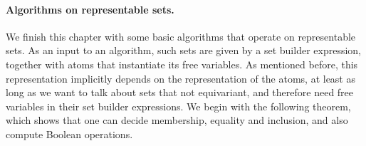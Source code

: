 \paragraph*{Algorithms on representable sets.}
\label{sec:algorithms-set-builder}
We finish this chapter with some basic algorithms that operate on representable sets. As an input to an algorithm, such sets are given by a set builder expression, together with atoms that instantiate its free variables. As mentioned before, this representation implicitly depends on the representation of the atoms, at least as long as we want to talk about sets that not equivariant, and therefore need free variables in their set builder expressions. 
We begin with the following theorem, which shows that one can decide membership, equality and inclusion, and also compute Boolean operations.


